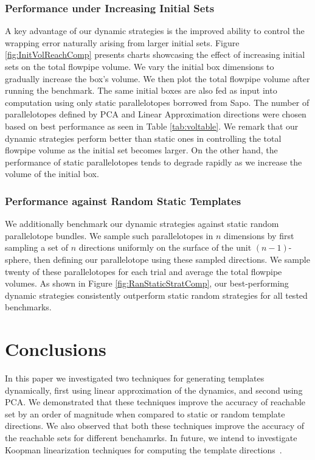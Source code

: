 \subsubsection{Performance under Increasing Initial Sets}
A key advantage of our dynamic strategies is the improved ability to control the wrapping error naturally arising from larger initial sets. Figure \ref{fig:InitVolReachComp} presents charts showcasing the effect of increasing initial sets on the total flowpipe volume. We vary the initial box dimensions to gradually increase the box's volume. We then plot the total flowpipe volume after running the benchmark. The same initial boxes are also fed as input into computation using only static parallelotopes borrowed from Sapo. The number of parallelotopes defined by PCA and Linear Approximation directions were chosen based on best performance as seen in Table \ref{tab:voltable}. We remark that our dynamic strategies perform better than static ones in controlling the total flowpipe volume as the initial set becomes larger. On the other hand, the performance of static parallelotopes tends to degrade rapidly as we increase the volume of the initial box.

\subsubsection{Performance against Random Static Templates}
We additionally benchmark our dynamic strategies against static random parallelotope bundles. We sample such parallelotopes in $n$ dimensions by first sampling a set of $n$ directions uniformly on the surface of the unit $(n-1)$-sphere, then defining our parallelotope using these sampled directions. We sample twenty of these parallelotopes for each trial and average the total flowpipe volumes. As shown in Figure \ref{fig:RanStaticStratComp}, our best-performing dynamic strategies consistently outperform static random strategies for all tested benchmarks.

\vspace{-1em}
\section{Conclusions}
In this paper we investigated two techniques for generating templates dynamically, first using linear approximation of the dynamics, and second using PCA.
%
We demonstrated that these techniques improve the accuracy of reachable set by an order of magnitude when compared to static or random template directions.
%
We also observed that both these techniques improve the accuracy of the reachable sets for different benchamrks.
%
In future, we intend to investigate Koopman linearization techniques for computing the template directions~\cite{bak2021reachability}.

